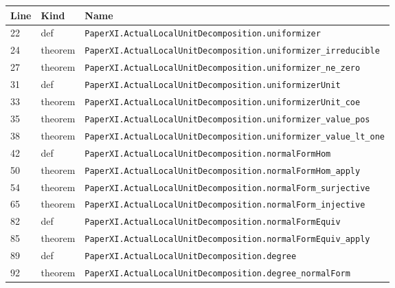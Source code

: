 \documentclass[10pt,oneside]{book}
\begin{document}
\begin{longtable}{@{}p{}p{}p{}@{}}\toprule Line&Kind&Name\\\midrule\endhead

22&def&\nolinkurl{PaperXI.ActualLocalUnitDecomposition.uniformizer}\\

24&theorem&\nolinkurl{PaperXI.ActualLocalUnitDecomposition.uniformizer_irreducible}\\

27&theorem&\nolinkurl{PaperXI.ActualLocalUnitDecomposition.uniformizer_ne_zero}\\

31&def&\nolinkurl{PaperXI.ActualLocalUnitDecomposition.uniformizerUnit}\\

33&theorem&\nolinkurl{PaperXI.ActualLocalUnitDecomposition.uniformizerUnit_coe}\\

35&theorem&\nolinkurl{PaperXI.ActualLocalUnitDecomposition.uniformizer_value_pos}\\

38&theorem&\nolinkurl{PaperXI.ActualLocalUnitDecomposition.uniformizer_value_lt_one}\\

42&def&\nolinkurl{PaperXI.ActualLocalUnitDecomposition.normalFormHom}\\

50&theorem&\nolinkurl{PaperXI.ActualLocalUnitDecomposition.normalFormHom_apply}\\

54&theorem&\nolinkurl{PaperXI.ActualLocalUnitDecomposition.normalForm_surjective}\\

65&theorem&\nolinkurl{PaperXI.ActualLocalUnitDecomposition.normalForm_injective}\\

82&def&\nolinkurl{PaperXI.ActualLocalUnitDecomposition.normalFormEquiv}\\

85&theorem&\nolinkurl{PaperXI.ActualLocalUnitDecomposition.normalFormEquiv_apply}\\

89&def&\nolinkurl{PaperXI.ActualLocalUnitDecomposition.degree}\\

92&theorem&\nolinkurl{PaperXI.ActualLocalUnitDecomposition.degree_normalForm}\\


\end{longtable}
\end{document}
